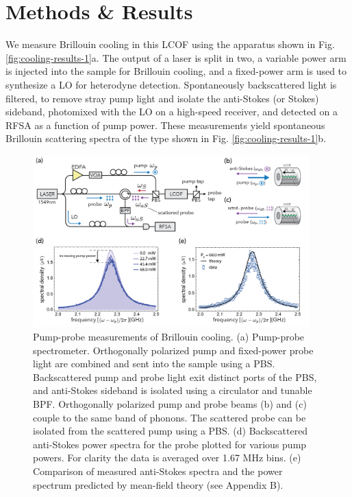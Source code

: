 \section{Methods \& Results}
We measure Brillouin cooling in this \ac{LCOF} using the apparatus shown in Fig. \ref{fig:cooling-results-1}a. The output of a laser is split in two, a variable power arm is injected into the sample for Brillouin cooling, and a fixed-power arm is used to synthesize a \ac{LO} for heterodyne detection. Spontaneously backscattered light is filtered, to remove stray pump light and isolate the anti-Stokes (or Stokes) sideband, photomixed with the \ac{LO} on a high-speed receiver, and detected on a \ac{RFSA} as a function of pump power. These measurements yield spontaneous Brillouin scattering spectra of the type shown in Fig. \ref{fig:cooling-results-1}b.

\begin{figure}[t]
    \centering \includegraphics[width=0.95\textwidth]{figs/2-Cooling/apparatus_pump_probe_v4-01.png}
    \caption{Pump-probe measurements of Brillouin cooling. (a) Pump-probe spectrometer. Orthogonally polarized pump and fixed-power probe light are combined and sent into the sample using a \ac{PBS}. Backscattered pump and probe light exit distinct ports of the PBS, and anti-Stokes sideband is isolated using a circulator and tunable  \ac{BPF}. Orthogonally polarized pump and probe beams (b) and (c) couple to the same band of phonons. The scattered probe can be isolated from the scattered pump using a PBS.
    (d) Backscattered anti-Stokes power spectra for the probe plotted for various pump powers. For clarity the data is averaged over 1.67 MHz bins. (e) Comparison of measured anti-Stokes spectra and the power spectrum predicted by mean-field theory (see Appendix B).}
    \label{fig:cooling-results-2}
\end{figure}

